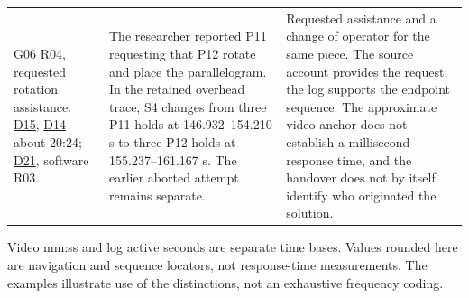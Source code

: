 \begin{longtable}{@{}>{\raggedright\arraybackslash}p{29.420mm}>{\raggedright\arraybackslash}p{63.744mm}>{\raggedright\arraybackslash}p{63.744mm}@{}}
\addlinespace[3pt]
G06 R04, requested rotation assistance. \hyperlink{src:D15}{D15}, \hyperlink{src:D14}{D14} about 20:24; \hyperlink{src:D21}{D21}, software R03. & The researcher reported P11 requesting that P12 rotate and place the parallelogram. In the retained overhead trace, S4 changes from three P11 holds at 146.932--154.210 s to three P12 holds at 155.237--161.167 s. The earlier aborted attempt remains separate. & Requested assistance and a change of operator for the same piece. The source account provides the request; the log supports the endpoint sequence. The approximate video anchor does not establish a millisecond response time, and the handover does not by itself identify who originated the solution. \\
\end{longtable}
\endgroup

Video mm:ss and log active seconds are separate time bases. Values rounded here are navigation and sequence locators, not response-time measurements. The examples illustrate use of the distinctions, not an exhaustive frequency coding.

